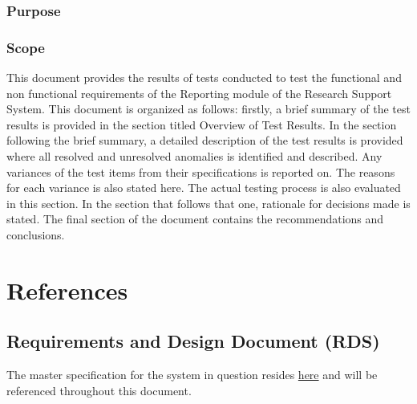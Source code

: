 \subsubsection{Purpose}

\subsubsection{Scope}
This document provides the results of tests conducted to test the functional and non functional requirements of the Reporting module of the Research Support System. This document is organized as follows: firstly, a brief summary of the test results is provided in the section titled Overview of Test Results. In the section following the brief summary, a detailed description of the test results is provided where all resolved and unresolved anomalies is identified and described. Any variances of the test items from their specifications is reported on. The reasons for each variance is also stated here. The actual testing process is also evaluated in this section. In the section that follows that one, rationale for decisions made is stated. The final section of the document contains the recommendations and conclusions.

\section{References} \label{sectionReferences}
\subsection{Requirements and Design Document (RDS)}
\hypersetup{
	linkcolor = blue       
}   
The master specification for the system in question resides \href{https://clickup.up.ac.za/bbcswebdav/pid-791422-dt-content-rid-8256558_1/xid-8256558_1}{here} and will be referenced throughout this document.